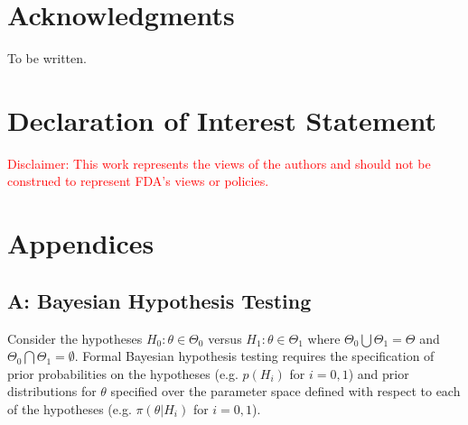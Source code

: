 \documentclass[12pt]{article}
\begin{document}
\section*{Acknowledgments}

To be written.

\section*{Declaration of Interest Statement}
\textcolor{red}{Disclaimer: This work represents the views of the authors and should not be construed to represent FDA's views or policies.}

  
 		

\newpage
\section*{Appendices}
\subsection*{A: Bayesian Hypothesis Testing}\label{sec:hypothesis}
Consider the hypotheses $H_0:\theta\in\Theta_{0}$ versus $H_1:\theta\in\Theta_{1}$ where $\Theta_{0}\bigcup \Theta_{1} = \Theta$ and $\Theta_{0} \bigcap \Theta_{1} = \emptyset$.
%
Formal Bayesian hypothesis testing requires the specification of prior probabilities on the hypotheses (e.g. $p(H_i)$ for $i=0,1$)
and prior distributions for $\theta$ specified over the parameter space defined with respect to each of the 
hypotheses (e.g. $\pi(\theta \big| H_i)$ for $i=0,1$). 
%
\end{document}
